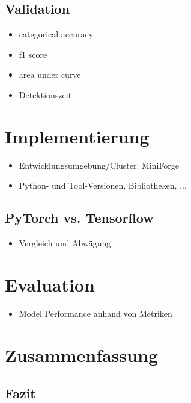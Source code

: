 \documentclass{article}
\begin{document}
    \subsection{Validation}
    \begin{itemize}
        \item categorical accuracy
        \item f1 score
        \item area under curve
        \item Detektionszeit
    \end{itemize}

    \section{Implementierung}
    \begin{itemize}
        \item Entwicklungsumgebung/Cluster: MiniForge
        \item Python- und Tool-Versionen, Bibliotheken, ... %
    \end{itemize}
    \subsection{PyTorch vs. Tensorflow}
    \begin{itemize}
        \item Vergleich und Abwägung
    \end{itemize}
    \section{Evaluation}
    \begin{itemize}
        \item Model Performance anhand von Metriken
    \end{itemize}

    \section{Zusammenfassung}
    \subsection{Fazit}
\end{document}
